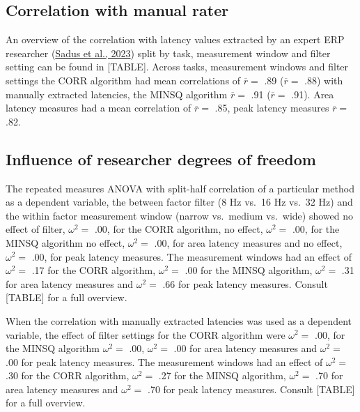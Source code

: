 \documentclass[
  man]{apa7}
\begin{document}
\hypertarget{correlation-with-manual-rater}{%
\subsection{Correlation with manual rater}\label{correlation-with-manual-rater}}

An overview of the correlation with latency values extracted by an expert ERP researcher (\protect\hyperlink{ref-sadus2023multiverse}{Sadus et al., 2023}) split by task, measurement window and filter setting can be found in {[}TABLE{]}. Across tasks, measurement windows and filter settings the CORR algorithm had mean correlations of \(\overline{r} =\) .89 (\(\overline{r} =\) .88) with manually extracted latencies, the MINSQ algorithm \(\overline{r} =\) .91 (\(\overline{r} =\) .91). Area latency measures had a mean correlation of \(\overline{r} =\) .85, peak latency measures \(\overline{r} =\) .82.

\hypertarget{influence-of-researcher-degrees-of-freedom}{%
\subsection{Influence of researcher degrees of freedom}\label{influence-of-researcher-degrees-of-freedom}}

The repeated measures ANOVA with split-half correlation of a particular method as a dependent variable, the between factor filter (8 Hz vs.~16 Hz vs.~32 Hz) and the within factor measurement window (narrow vs.~medium vs.~wide) showed no effect of filter, \(\omega^2 =\) .00, for the CORR algorithm, no effect, \(\omega^2 =\) .00, for the MINSQ algorithm no effect, \(\omega^2 =\) .00, for area latency measures and no effect, \(\omega^2 =\) .00, for peak latency measures. The measurement windows had an effect of \(\omega^2 =\) .17 for the CORR algorithm, \(\omega^2 =\) .00 for the MINSQ algorithm, \(\omega^2 =\) .31 for area latency measures and \(\omega^2 =\) .66 for peak latency measures. Consult {[}TABLE{]} for a full overview.

When the correlation with manually extracted latencies was used as a dependent variable, the effect of filter settings for the CORR algorithm were \(\omega^2 =\) .00, for the MINSQ algorithm \(\omega^2 =\) .00, \(\omega^2 =\) .00 for area latency measures and \(\omega^2 =\) .00 for peak latency measures. The measurement windows had an effect of \(\omega^2 =\) .30 for the CORR algorithm, \(\omega^2 =\) .27 for the MINSQ algorithm, \(\omega^2 =\) .70 for area latency measures and \(\omega^2 =\) .70 for peak latency measures. Consult {[}TABLE{]} for a full overview.
\end{document}
